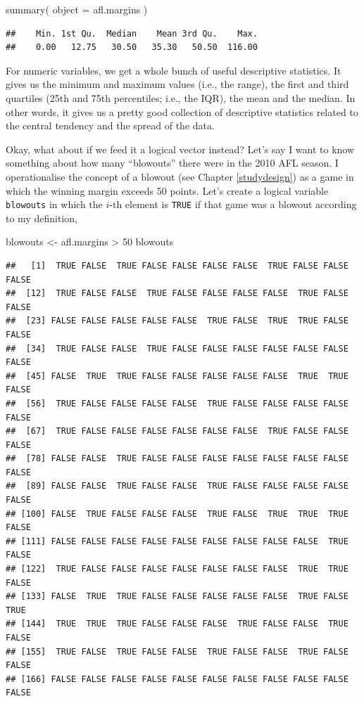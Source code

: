 \documentclass[
]{book}
\newenvironment{Shaded}{\begin{snugshade}}{\end{snugshade}}
\newcommand{\AttributeTok}[1]{\textcolor[rgb]{0.77,0.63,0.00}{#1}}
\newcommand{\DecValTok}[1]{\textcolor[rgb]{0.00,0.00,0.81}{#1}}
\newcommand{\FunctionTok}[1]{\textcolor[rgb]{0.00,0.00,0.00}{#1}}
\newcommand{\NormalTok}[1]{#1}
\newcommand{\OtherTok}[1]{\textcolor[rgb]{0.56,0.35,0.01}{#1}}
\newcommand{\SpecialCharTok}[1]{\textcolor[rgb]{0.00,0.00,0.00}{#1}}
\begin{document}
\begin{Shaded}
\begin{Highlighting}[]
\FunctionTok{summary}\NormalTok{( }\AttributeTok{object =}\NormalTok{ afl.margins )  }
\end{Highlighting}
\end{Shaded}

\begin{verbatim}
##    Min. 1st Qu.  Median    Mean 3rd Qu.    Max. 
##    0.00   12.75   30.50   35.30   50.50  116.00
\end{verbatim}

For numeric variables, we get a whole bunch of useful descriptive statistics. It gives us the minimum and maximum values (i.e., the range), the first and third quartiles (25th and 75th percentiles; i.e., the IQR), the mean and the median. In other words, it gives us a pretty good collection of descriptive statistics related to the central tendency and the spread of the data.

Okay, what about if we feed it a logical vector instead? Let's say I want to know something about how many ``blowouts'' there were in the 2010 AFL season. I operationalise the concept of a blowout (see Chapter \ref{studydesign}) as a game in which the winning margin exceeds 50 points. Let's create a logical variable \texttt{blowouts} in which the \(i\)-th element is \texttt{TRUE} if that game was a blowout according to my definition,

\begin{Shaded}
\begin{Highlighting}[]
\NormalTok{blowouts }\OtherTok{\textless{}{-}}\NormalTok{  afl.margins }\SpecialCharTok{\textgreater{}} \DecValTok{50}
\NormalTok{blowouts}
\end{Highlighting}
\end{Shaded}

\begin{verbatim}
##   [1]  TRUE FALSE  TRUE FALSE FALSE FALSE FALSE  TRUE FALSE FALSE FALSE
##  [12]  TRUE FALSE FALSE  TRUE FALSE FALSE FALSE FALSE  TRUE FALSE FALSE
##  [23] FALSE FALSE FALSE FALSE FALSE  TRUE FALSE  TRUE  TRUE FALSE FALSE
##  [34]  TRUE FALSE FALSE  TRUE FALSE FALSE FALSE FALSE FALSE FALSE FALSE
##  [45] FALSE  TRUE  TRUE FALSE FALSE FALSE FALSE FALSE  TRUE  TRUE FALSE
##  [56]  TRUE FALSE FALSE FALSE FALSE  TRUE FALSE FALSE FALSE FALSE FALSE
##  [67]  TRUE FALSE FALSE FALSE FALSE FALSE FALSE  TRUE FALSE FALSE FALSE
##  [78] FALSE FALSE  TRUE FALSE FALSE FALSE FALSE FALSE FALSE FALSE FALSE
##  [89] FALSE FALSE  TRUE FALSE FALSE  TRUE FALSE FALSE FALSE FALSE FALSE
## [100] FALSE  TRUE FALSE FALSE FALSE  TRUE FALSE  TRUE  TRUE  TRUE FALSE
## [111] FALSE FALSE FALSE FALSE FALSE FALSE FALSE FALSE FALSE  TRUE FALSE
## [122]  TRUE FALSE FALSE FALSE FALSE FALSE FALSE FALSE  TRUE  TRUE FALSE
## [133] FALSE  TRUE  TRUE FALSE FALSE FALSE FALSE FALSE  TRUE FALSE  TRUE
## [144]  TRUE  TRUE  TRUE FALSE FALSE FALSE  TRUE FALSE FALSE  TRUE FALSE
## [155]  TRUE FALSE  TRUE FALSE FALSE  TRUE FALSE FALSE  TRUE FALSE FALSE
## [166] FALSE FALSE FALSE FALSE FALSE FALSE FALSE FALSE FALSE FALSE FALSE
\end{verbatim}
\end{document}
